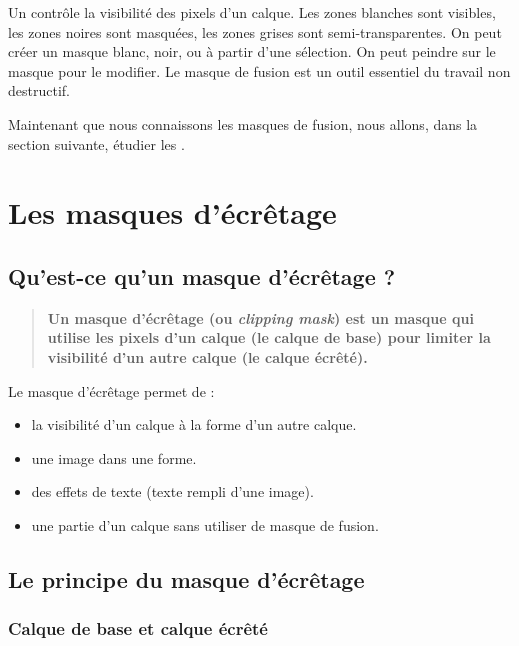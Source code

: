 Un  contrôle la visibilité des pixels d'un calque. Les zones blanches sont visibles, les zones noires sont masquées, les zones grises sont semi-transparentes. On peut créer un masque blanc, noir, ou à partir d'une sélection. On peut peindre sur le masque pour le modifier. Le masque de fusion est un outil essentiel du travail non destructif.

Maintenant que nous connaissons les masques de fusion, nous allons, dans la section suivante, étudier les .

\section{Les masques d'écrêtage}

\subsection{Qu'est-ce qu'un masque d'écrêtage ?}

\begin{quote}
\textbf{Un masque d'écrêtage (ou \emph{clipping mask}) est un masque qui utilise les pixels d'un calque (le calque de base) pour limiter la visibilité d'un autre calque (le calque écrêté).}
\end{quote}

Le masque d'écrêtage permet de :

\begin{itemize}
    \item {} la visibilité d'un calque à la forme d'un autre calque.
    \item {} une image dans une forme.
    \item {} des effets de texte (texte rempli d'une image).
    \item {} une partie d'un calque sans utiliser de masque de fusion.
\end{itemize}

\subsection{Le principe du masque d'écrêtage}

\subsubsection{Calque de base et calque écrêté}

